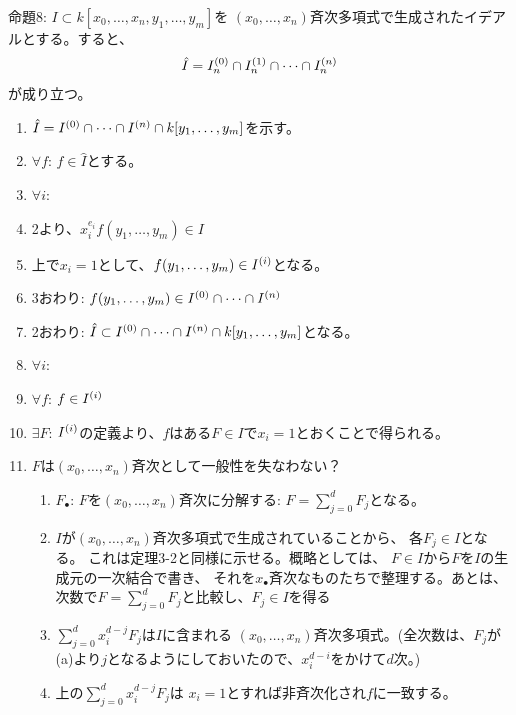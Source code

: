 \begin{framed}
  命題8:
  $I\subset k[x_0,\dots,x_n,y_1,\dots,y_m]$を
  $(x_0,\dots,x_n)$斉次多項式で生成されたイデアルとする。すると、
  \begin{align}
    \hat I = I_n^{(0)}\cap I_n^{(1)} \cap \dots \cap I_n^{(n)}
  \end{align}
  が成り立つ。
\end{framed}
\begin{myproof}
  \begin{enumerate}
    \item $\hat I = I^{(0)}\cap \dots \cap I^{(n)}\cap k[y_1,\dots,y_m]$を示す。
    \item
    $\forall f$: $f\in \hat I$とする。
    \item $\forall i$:
    \item
    2より、$x_i^{e_i} f(y_1,\dots,y_m) \in I$
    \item
    上で$x_i = 1$として、$f(y_1,\dots,y_m)\in I^{(i)}$となる。
    \item
    3おわり: $f(y_1,\dots,y_m)\in I^{(0)}\cap \dots \cap I^{(n)}$
    \item
    2おわり: $\hat I \subset I^{(0)}\cap \dots \cap I^{(n)} \cap k[y_1,\dots,y_m]$となる。
    \item $\forall i$:
    \item $\forall f$:
    $f\in I^{(i)}$
    \item $\exists F$:
    $I^{(i)}$の定義より、$f$はある$F\in I$で$x_i = 1$とおくことで得られる。
    \item $F$は$(x_0,\dots,x_n)$斉次として一般性を失なわない？
    \begin{enumerate}
      \item  $F_\bullet$:
      $F$を$(x_0,\dots,x_n)$斉次に分解する:
      $F=\sum_{j=0}^d F_j$となる。
      \item $I$が$(x_0,\dots,x_n)$斉次多項式で生成されていることから、
      各$F_j \in I$となる。 これは定理3-2と同様に示せる。概略としては、
      $F\in I$から$F$を$I$の生成元の一次結合で書き、
      それを$x_\bullet$斉次なものたちで整理する。あとは、
      次数で$F=\sum_{j=0}^d F_j$と比較し、$F_j \in I$を得る
      \item
      $\sum_{j=0}^d x_i^{d-j}F_j$は$I$に含まれる
      $(x_0,\dots,x_n)$斉次多項式。(全次数は、$F_j$が(a)より$j$となるようにしておいたので、$x_i^{d-i}$をかけて$d$次。)
      \item
      上の$\sum_{j=0}^d x_i^{d-j}F_j$は
      $x_i=1$とすれば非斉次化され$f$に一致する。

\end{enumerate}
\end{enumerate}
\end{myproof}

